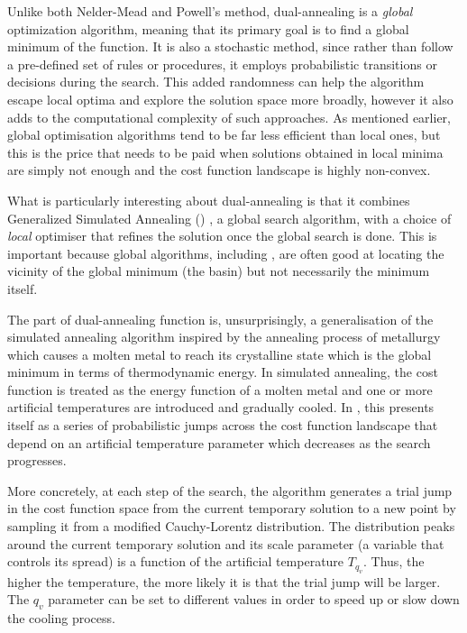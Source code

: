Unlike both Nelder-Mead and Powell's method, dual-annealing is a \emph{global} optimization algorithm, meaning that its primary goal is to find a global minimum of the function. It is also a stochastic method, since rather than follow a pre-defined set of rules or procedures, it employs probabilistic transitions or decisions during the search. This added randomness can help the algorithm escape local optima and explore the solution space more broadly, however it also adds to the computational complexity of such approaches. As mentioned earlier, global optimisation algorithms tend to be far less efficient than local ones, but this is the price that needs to be paid when solutions obtained in local minima are simply not enough and the cost function landscape is highly non-convex. 

What is particularly interesting about dual-annealing is that it combines Generalized Simulated Annealing () \cite{tsallis_generalized_1996}, a global search algorithm, with a choice of \emph{local} optimiser that refines the solution once the global search is done. This is important because global algorithms, including , are often good at locating the vicinity of the global minimum (the basin) but not necessarily the minimum itself. 

The  part of dual-annealing function is, unsurprisingly, a generalisation of the simulated annealing algorithm \cite{kirkpatrick_optimization_1983} inspired by the annealing process of metallurgy which causes a molten metal to reach its crystalline state which is the global minimum in terms of thermodynamic energy. In simulated annealing, the cost function is treated as the energy function of a molten metal and one or more artificial temperatures are introduced and gradually cooled. In , this presents itself as a series of probabilistic jumps across the cost function landscape that depend on an artificial temperature parameter which decreases as the search progresses. 

More concretely, at each step of the search, the algorithm generates a trial jump in the cost function space from the current temporary solution to a new point by sampling it from a modified Cauchy-Lorentz distribution. The distribution peaks around the current temporary solution and its scale parameter (a variable that controls its spread) is a function of the artificial temperature $T_{q_v}$. Thus, the higher the temperature, the more likely it is that the trial jump will be larger. The $q_v$ parameter can be set to different values in order to speed up or slow down the cooling process.

